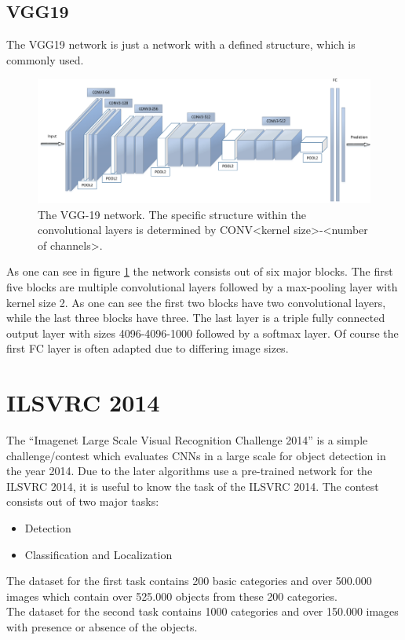 \documentclass[
     11pt,         %
     a4paper,      %
     oneside,
     ]{article}
\begin{document}
\subsection{VGG19}
The VGG19 network is just a network with a defined structure, which is commonly used.
\begin{figure}[H]
  \begin{center}
    \includegraphics[width=1.0\textwidth]{images/VGG19-orig.png}
    \caption{The VGG-19 network. The specific structure within the convolutional layers is determined by CONV<kernel size>-<number of channels>.\cite{VGG19}}
    \label{fig:VGG19-orig}
  \end{center}
\end{figure}
As one can see in figure \ref{fig:VGG19-orig} the network consists out of six major blocks. The first five blocks are multiple convolutional layers followed by a max-pooling layer with kernel size 2. As one can see the first two blocks have two convolutional layers, while the last three blocks have three. The last layer is a triple fully connected output layer with sizes 4096-4096-1000 followed by a softmax layer. Of course the first FC layer is often adapted due to differing image sizes.

\section{ILSVRC 2014}
The \enquote{Imagenet Large Scale Visual Recognition Challenge 2014} is a simple challenge/contest which evaluates CNNs in a large scale for object detection in the year 2014.
Due to the later algorithms use a pre-trained network for the ILSVRC 2014, it is useful to know the task of the ILSVRC 2014.
The contest consists out of two major tasks:
\begin{itemize}
  \item Detection
  \item Classification and Localization
\end{itemize}
The dataset for the first task contains 200 basic categories and over 500.000 images which contain over 525.000 objects from these 200 categories.\\
The dataset for the second task contains 1000 categories and over 150.000 images with presence or absence of the objects.\cite{ILSVRC15}\cite{ILSVRC152}\\
\end{document}
